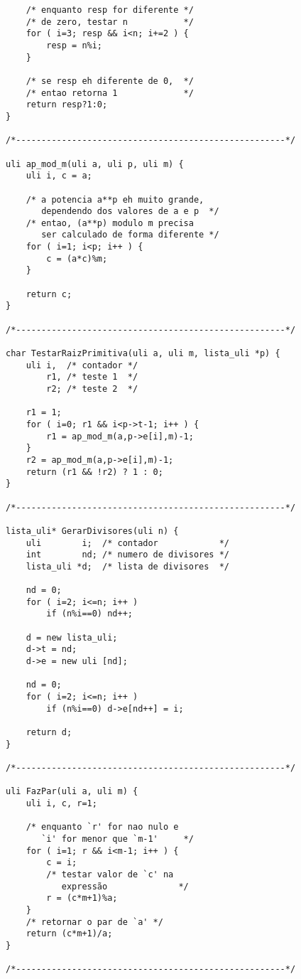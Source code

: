 \documentclass[a4paper,12pt,oneside,onecolumn]{uerj}
\begin{document}
\begin{verbatim}
    /* enquanto resp for diferente */
    /* de zero, testar n           */
    for ( i=3; resp && i<n; i+=2 ) {
        resp = n%i;
    }

    /* se resp eh diferente de 0,  */
    /* entao retorna 1             */
    return resp?1:0;
}

/*-----------------------------------------------------*/

uli ap_mod_m(uli a, uli p, uli m) {
    uli i, c = a;

    /* a potencia a**p eh muito grande, 
       dependendo dos valores de a e p  */
    /* entao, (a**p) modulo m precisa 
       ser calculado de forma diferente */
    for ( i=1; i<p; i++ ) {
        c = (a*c)%m;
    }

    return c;
}

/*-----------------------------------------------------*/

char TestarRaizPrimitiva(uli a, uli m, lista_uli *p) {
    uli i,  /* contador */
        r1, /* teste 1  */
        r2; /* teste 2  */

    r1 = 1;
    for ( i=0; r1 && i<p->t-1; i++ ) {
        r1 = ap_mod_m(a,p->e[i],m)-1;
    }
    r2 = ap_mod_m(a,p->e[i],m)-1;
    return (r1 && !r2) ? 1 : 0;
}

/*-----------------------------------------------------*/

lista_uli* GerarDivisores(uli n) {
    uli        i;  /* contador            */
    int        nd; /* numero de divisores */
    lista_uli *d;  /* lista de divisores  */

    nd = 0;
    for ( i=2; i<=n; i++ ) 
        if (n%i==0) nd++;

    d = new lista_uli;
    d->t = nd;
    d->e = new uli [nd];

    nd = 0;
    for ( i=2; i<=n; i++ )
        if (n%i==0) d->e[nd++] = i;

    return d;
}

/*-----------------------------------------------------*/

uli FazPar(uli a, uli m) {
    uli i, c, r=1;

    /* enquanto `r' for nao nulo e 
       `i' for menor que `m-1'     */
    for ( i=1; r && i<m-1; i++ ) {
        c = i;
        /* testar valor de `c' na 
           expressão              */
        r = (c*m+1)%a;
    }
    /* retornar o par de `a' */
    return (c*m+1)/a;
}

/*-----------------------------------------------------*/
\end{verbatim}
\end{document}
